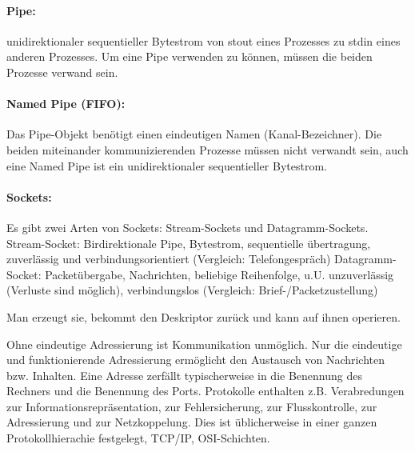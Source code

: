 \question{}
\begin{answer}

\paragraph*{Pipe:}
unidirektionaler sequentieller Bytestrom von stout eines Prozesses zu stdin eines anderen Prozesses. Um eine Pipe verwenden zu können, müssen die beiden Prozesse verwand sein.

\paragraph*{Named Pipe (FIFO):}
Das Pipe-Objekt benötigt einen eindeutigen Namen (Kanal-Bezeichner). Die
beiden miteinander kommunizierenden Prozesse müssen nicht verwandt sein, auch eine Named Pipe ist ein unidirektionaler sequentieller Bytestrom.

\paragraph*{Sockets:}
Es gibt zwei Arten von Sockets: Stream-Sockets und Datagramm-Sockets.
Stream-Socket: Birdirektionale Pipe, Bytestrom, sequentielle übertragung, zuverlässig und verbindungsorientiert (Vergleich: Telefongespräch)
Datagramm-Socket: Packetübergabe, Nachrichten, beliebige Reihenfolge, u.U. unzuverlässig (Verluste
sind möglich), verbindungslos (Vergleich: Brief-/Packetzustellung)
\end{answer}

\begin{answer}
Man erzeugt sie, bekommt den Deskriptor zurück und kann auf ihnen operieren.
\end{answer}

\begin{answer}
Ohne eindeutige Adressierung ist Kommunikation unmöglich. Nur die eindeutige und funktionierende
Adressierung ermöglicht den Austausch von Nachrichten bzw. Inhalten.
Eine Adresse zerfällt typischerweise in die Benennung des Rechners und die Benennung des Ports.
Protokolle enthalten z.B. Verabredungen zur Informationsrepräsentation, zur Fehlersicherung, zur
Flusskontrolle, zur Adressierung und zur Netzkoppelung. Dies ist üblicherweise in einer ganzen
Protokollhierachie festgelegt, TCP/IP, OSI-Schichten.
\end{answer}

